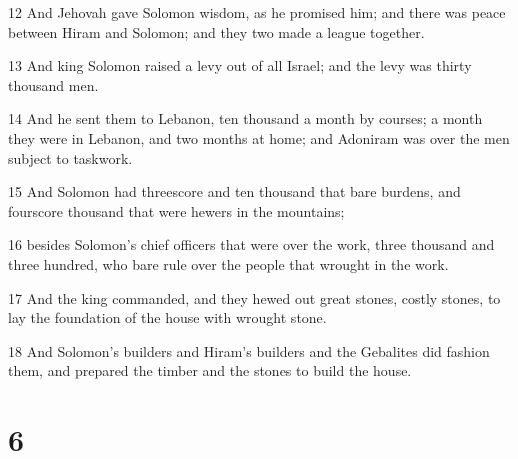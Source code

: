 \par 12 And Jehovah gave Solomon wisdom, as he promised him; and there was peace between Hiram and Solomon; and they two made a league together.
\par 13 And king Solomon raised a levy out of all Israel; and the levy was thirty thousand men.
\par 14 And he sent them to Lebanon, ten thousand a month by courses; a month they were in Lebanon, and two months at home; and Adoniram was over the men subject to taskwork.
\par 15 And Solomon had threescore and ten thousand that bare burdens, and fourscore thousand that were hewers in the mountains;
\par 16 besides Solomon's chief officers that were over the work, three thousand and three hundred, who bare rule over the people that wrought in the work.
\par 17 And the king commanded, and they hewed out great stones, costly stones, to lay the foundation of the house with wrought stone.
\par 18 And Solomon's builders and Hiram's builders and the Gebalites did fashion them, and prepared the timber and the stones to build the house.

\chapter{6}

